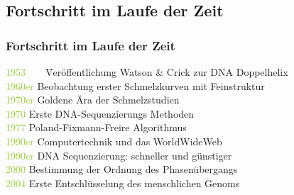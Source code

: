\subsection{Fortschritt im Laufe der Zeit}
\begin{frame}
\frametitle{Fortschritt im Laufe der Zeit}
\begin{tabbing}
 \textcolor{YellowGreen}{1953}$\qquad$\= Veröffentlichung Watson \& Crick zur DNA Doppelhelix\\
\textcolor{YellowGreen}{1960er}\> Beobachtung erster Schmelzkurven mit Feinstruktur\\
\textcolor{YellowGreen}{1970er}\> Goldene Ära der Schmelzstudien\\
\textcolor{YellowGreen}{1970}\> Erste DNA-Sequenzierungs Methoden\\
\textcolor{YellowGreen}{1977}\> Poland-Fixmann-Freire Algorithmus\\
\textcolor{YellowGreen}{1990er}\> Computertechnik und das WorldWideWeb\\
\textcolor{YellowGreen}{1990er}\> DNA Sequenzierung: schneller und günstiger\\
\textcolor{YellowGreen}{2000} \>Bestimmung der Ordnung des Phasenübergangs\\
\textcolor{YellowGreen}{2004} \>Erste Entschlüsselung des menschlichen Genoms
\end{tabbing}
\end{frame}